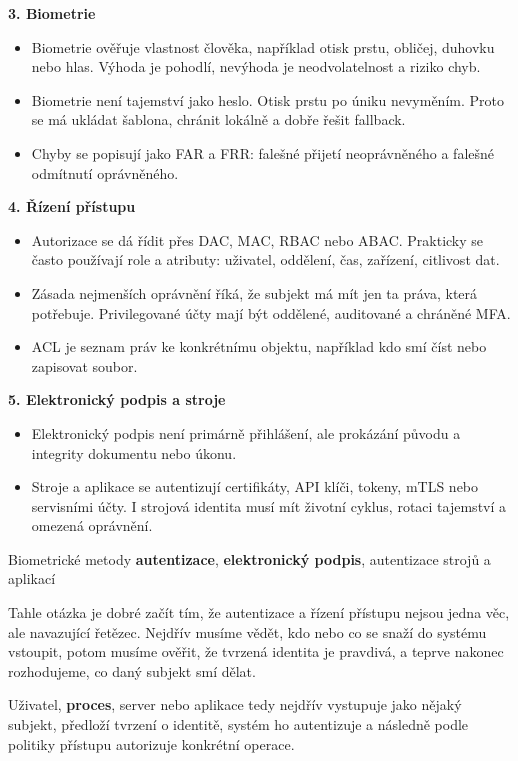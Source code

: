 \documentclass[11pt,a4paper]{article}
\begin{document}
\textbf{3. Biometrie}
\begin{itemize}
  \item Biometrie ověřuje vlastnost člověka, například otisk prstu, obličej, duhovku nebo hlas. Výhoda je pohodlí, nevýhoda je neodvolatelnost a riziko chyb.
  \item Biometrie není tajemství jako heslo. Otisk prstu po úniku nevyměním. Proto se má ukládat šablona, chránit lokálně a dobře řešit fallback.
  \item Chyby se popisují jako FAR a FRR: falešné přijetí neoprávněného a falešné odmítnutí oprávněného.
\end{itemize}

\textbf{4. Řízení přístupu}
\begin{itemize}
  \item Autorizace se dá řídit přes DAC, MAC, RBAC nebo ABAC. Prakticky se často používají role a atributy: uživatel, oddělení, čas, zařízení, citlivost dat.
  \item Zásada nejmenších oprávnění říká, že subjekt má mít jen ta práva, která potřebuje. Privilegované účty mají být oddělené, auditované a chráněné MFA.
  \item ACL je seznam práv ke konkrétnímu objektu, například kdo smí číst nebo zapisovat soubor.
\end{itemize}

\textbf{5. Elektronický podpis a stroje}
\begin{itemize}
  \item Elektronický podpis není primárně přihlášení, ale prokázání původu a integrity dokumentu nebo úkonu.
  \item Stroje a aplikace se autentizují certifikáty, API klíči, tokeny, mTLS nebo servisními účty. I strojová identita musí mít životní cyklus, rotaci tajemství a omezená oprávnění.
\end{itemize}

Biometrické metody \textbf{autentizace}, \textbf{elektronický podpis}, autentizace strojů a aplikací

Tahle otázka je dobré začít tím, že autentizace a řízení přístupu nejsou jedna věc, ale navazující řetězec. Nejdřív musíme vědět, kdo nebo co se snaží do systému vstoupit, potom musíme ověřit, že tvrzená identita je pravdivá, a teprve nakonec rozhodujeme, co daný subjekt smí dělat.

Uživatel, \textbf{proces}, server nebo aplikace tedy nejdřív vystupuje jako nějaký subjekt, předloží tvrzení o identitě, systém ho autentizuje a následně podle politiky přístupu autorizuje konkrétní operace.
\end{document}
